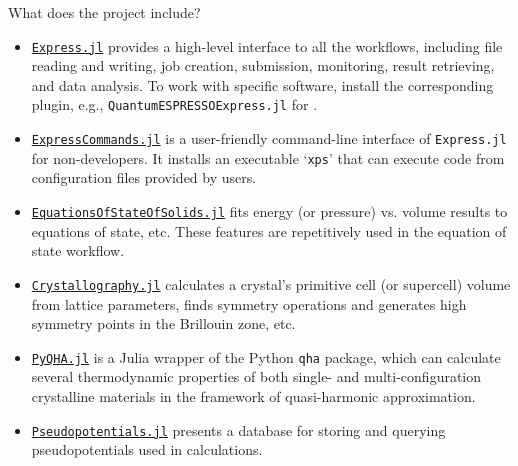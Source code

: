 \begin{frame}[allowframebreaks]{What does the \express{} project include?}
    \begin{figure}
        \centering
        \label{fig:components}
    \end{figure}

    \begin{itemize}
        \item \href{https://github.com/MineralsCloud/Express.jl}{\texttt{Express.jl}}
              provides a high-level interface to all the
              workflows, including file reading and writing, job
              creation, submission, monitoring, result retrieving, and data
              analysis. To work with specific software, install the corresponding plugin,
              e.g., \texttt{QuantumESPRESSOExpress.jl} for \qe.
        \item \href{https://github.com/MineralsCloud/ExpressCommands.jl}{\texttt{ExpressCommands.jl}}
              is a user-friendly command-line interface of
              \texttt{Express.jl} for non-developers. It installs an executable
              `\texttt{xps}' that can execute code from configuration files provided by users.
        \item \href{https://github.com/MineralsCloud/EquationsOfStateOfSolids.jl}{\texttt{EquationsOfStateOfSolids.jl}}
              fits energy (or pressure) vs. volume results to equations of state,
              etc. These features are repetitively used in the equation of state workflow.
        \item \href{https://github.com/MineralsCloud/Crystallography.jl}{\texttt{Crystallography.jl}}
              calculates a crystal's primitive cell (or supercell) volume from lattice parameters, finds symmetry
              operations and generates high symmetry points in the Brillouin zone, etc.
        \item \href{https://github.com/MineralsCloud/PyQHA.jl}{\texttt{PyQHA.jl}}
              is a Julia wrapper of
              the Python \texttt{qha} package, which can calculate
              several thermodynamic properties of both single- and multi-configuration
              crystalline materials in the framework of quasi-harmonic approximation.
        \item \href{https://github.com/MineralsCloud/Pseudopotentials.jl}{\texttt{Pseudopotentials.jl}} presents
              a database for storing and querying pseudopotentials used in \ab{} calculations.

\end{itemize}
\end{frame}
